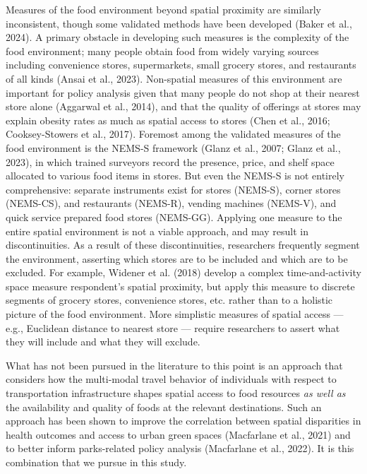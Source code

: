 \documentclass[
  letterpaper,
  number,
  review,
  3p]{elsarticle}
\begin{document}
Measures of the food environment beyond spatial proximity are similarly
inconsistent, though some validated methods have been developed (Baker
et al., 2024). A primary obstacle in developing such measures is the
complexity of the food environment; many people obtain food from widely
varying sources including convenience stores, supermarkets, small
grocery stores, and restaurants of all kinds (Ansai et al., 2023).
Non-spatial measures of this environment are important for policy
analysis given that many people do not shop at their nearest store alone
(Aggarwal et al., 2014), and that the quality of offerings at stores may
explain obesity rates as much as spatial access to stores (Chen et al.,
2016; Cooksey-Stowers et al., 2017). Foremost among the validated
measures of the food environment is the NEMS-S framework (Glanz et al.,
2007; Glanz et al., 2023), in which trained surveyors record the
presence, price, and shelf space allocated to various food items in
stores. But even the NEMS-S is not entirely comprehensive: separate
instruments exist for stores (NEMS-S), corner stores (NEMS-CS), and
restaurants (NEMS-R), vending machines (NEMS-V), and quick service
prepared food stores (NEMS-GG). Applying one measure to the entire
spatial environment is not a viable approach, and may result in
discontinuities. As a result of these discontinuities, researchers
frequently segment the environment, asserting which stores are to be
included and which are to be excluded. For example, Widener et al.
(2018) develop a complex time-and-activity space measure respondent's
spatial proximity, but apply this measure to discrete segments of
grocery stores, convenience stores, etc. rather than to a holistic
picture of the food environment. More simplistic measures of spatial
access --- e.g., Euclidean distance to nearest store --- require
researchers to assert what they will include and what they will exclude.

What has not been pursued in the literature to this point is an approach
that considers how the multi-modal travel behavior of individuals with
respect to transportation infrastructure shapes spatial access to food
resources \emph{as well as} the availability and quality of foods at the
relevant destinations. Such an approach has been shown to improve the
correlation between spatial disparities in health outcomes and access to
urban green spaces (Macfarlane et al., 2021) and to better inform
parks-related policy analysis (Macfarlane et al., 2022). It is this
combination that we pursue in this study.
\end{document}
